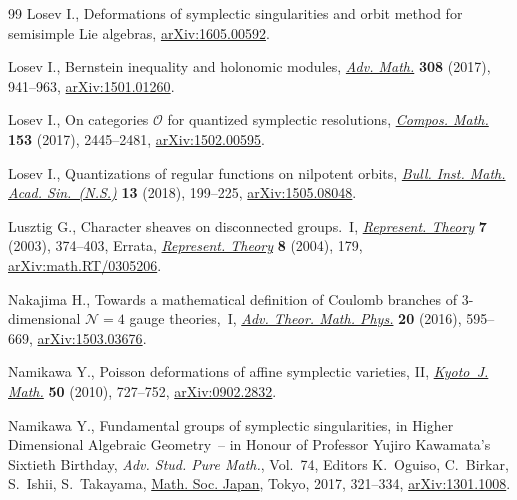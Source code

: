 \documentclass[pdftex]{sigma}
\numberwithin{equation}{section}
\begin{document}
\begin{thebibliography}{99}
Losev I., Deformations of symplectic singularities and orbit method for
 semisimple {L}ie algebras, \href{https://arxiv.org/abs/1605.00592}{arXiv:1605.00592}.

Losev I., Bernstein inequality and holonomic modules, \href{https://doi.org/10.1016/j.aim.2016.12.033}{\textit{Adv. Math.}}
 \textbf{308} (2017), 941--963, \href{https://arxiv.org/abs/1501.01260}{arXiv:1501.01260}.

Losev I., On categories {$\mathcal O$} for quantized symplectic resolutions,
 \href{https://doi.org/10.1112/S0010437X17007382}{\textit{Compos. Math.}} \textbf{153} (2017), 2445--2481, \href{https://arxiv.org/abs/1502.00595}{arXiv:1502.00595}.

Losev I., Quantizations of regular functions on nilpotent orbits, \href{https://doi.org/10.21915/BIMAS.2018202}{\textit{Bull.
 Inst. Math. Acad. Sin.~(N.S.)}} \textbf{13} (2018), 199--225,
 \href{https://arxiv.org/abs/1505.08048}{arXiv:1505.08048}.

Lusztig G., Character sheaves on disconnected groups.~{I}, \href{https://doi.org/10.1090/S1088-4165-03-00204-8}{\textit{Represent.
 Theory}} \textbf{7} (2003), 374--403, {E}rrata,
 \href{https://doi.org/10.1090/S1088-4165-04-00247-X}{\textit{Represent.
 Theory}} \textbf{8} (2004), 179, \href{https://arxiv.org/abs/math.RT/0305206}{arXiv:math.RT/0305206}.

Nakajima H., Towards a mathematical definition of {C}oulomb branches of
 3-dimensional {${\mathcal N}=4$} gauge theories,~{I}, \href{https://doi.org/10.4310/ATMP.2016.v20.n3.a4}{\textit{Adv. Theor.
 Math. Phys.}} \textbf{20} (2016), 595--669, \href{https://arxiv.org/abs/1503.03676}{arXiv:1503.03676}.

Namikawa Y., Poisson deformations of affine symplectic varieties, {II},
 \href{https://doi.org/10.1215/0023608X-2010-012}{\textit{Kyoto~J. Math.}} \textbf{50} (2010), 727--752, \href{https://arxiv.org/abs/0902.2832}{arXiv:0902.2832}.

Namikawa Y., Fundamental groups of symplectic singularities, in Higher
 Dimensional Algebraic Geometry~-- in Honour of {P}rofessor {Y}ujiro
 {K}awamata's Sixtieth Birthday, \textit{Adv. Stud. Pure Math.}, Vol.~74,
 Editors K.~Oguiso, C.~Birkar, S.~Ishii, S.~Takayama, \href{https://doi.org/10.2969/aspm/07410321}{Math. Soc. Japan}, Tokyo,
 2017, 321--334, \href{https://arxiv.org/abs/1301.1008}{arXiv:1301.1008}.


\end{thebibliography}
\end{document}
